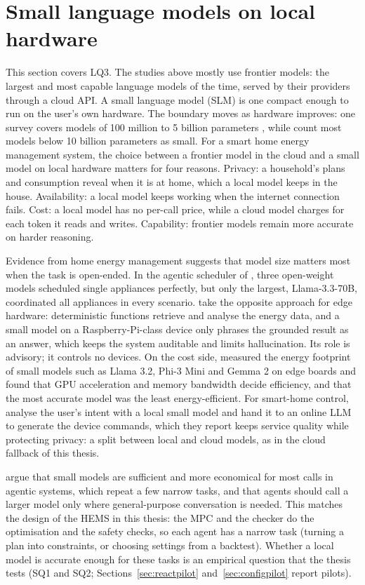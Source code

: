 \section{Small language models on local hardware}
\label{sec:llmslm}

This section covers LQ3. The studies above mostly use frontier models:
the largest and most
capable language models of the time, served by their providers through a
cloud API. A small language model (SLM) is one compact enough to run on
the user's own hardware. The boundary moves as hardware improves: one
survey covers models of 100 million to 5 billion parameters
\parencite{lu2024}, while \textcite{belcak2025} count most models below
10 billion parameters as small. For a smart home energy management
system, the choice between a frontier model in the cloud and a small
model on local hardware matters for four reasons. Privacy: a household's plans
and consumption reveal when it is at home, which a local model keeps in
the house. Availability: a local model keeps working when the internet
connection fails. Cost: a local model has no per-call price, while a
cloud model charges for each token it reads and writes. Capability:
frontier models remain more accurate on harder reasoning.

Evidence from home energy management suggests that model size matters
most when the task is open-ended. In the agentic scheduler of
\textcite{elmakroum2026}, three open-weight models scheduled single
appliances perfectly, but only the largest, Llama-3.3-70B, coordinated
all appliances in every scenario. \textcite{spaias2027} take the
opposite approach for edge hardware: deterministic functions retrieve
and analyse the energy data, and a small model on a Raspberry-Pi-class
device only phrases the grounded result as an answer, which keeps the
system auditable and limits hallucination. Its role is advisory; it
controls no devices. On the cost side, \textcite{islam2025} measured
the energy footprint of small models such as Llama 3.2, Phi-3 Mini and
Gemma 2 on edge boards and found that GPU acceleration and memory
bandwidth decide efficiency, and that the most accurate model was the
least energy-efficient. For smart-home control, \textcite{dong2025}
analyse the user's intent with a local small model and hand it to an
online LLM to generate the device commands, which they report keeps
service quality while protecting privacy: a split between local and
cloud models, as in the cloud fallback of this thesis.

\textcite{belcak2025} argue that small models are sufficient and more
economical for most calls in agentic systems, which repeat a few narrow
tasks, and that agents should call a larger model only where
general-purpose conversation is needed. This matches the design of the
HEMS in this thesis: the MPC and the checker do the optimisation and the safety
checks, so each agent has a narrow task (turning a plan into
constraints, or choosing settings from a backtest). Whether a local
model is accurate enough for these tasks is an empirical question that
the thesis tests (SQ1 and SQ2; Sections~\ref{sec:reactpilot}
and~\ref{sec:configpilot} report pilots).

